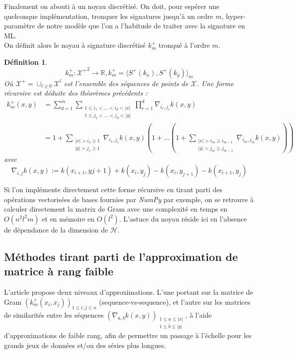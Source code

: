 \documentclass[10pt,a4paper]{article}
\newtheorem{definition}{Définition}
\begin{document}
Finalement on abouti à un noyau discrétisé. On doit, pour espérer une quelconque implémentation, tronquer les signatures jusqu'à un ordre $m$, hyper-paramètre de notre modèle que l'on a l'habitude de traiter avec la signature en ML.\\
On définit alors le noyau à signature discrétisé $k^+_m$ tronqué à l'ordre $m$.
\begin{definition}

\[ k^+_m : {\mathcal{X}^+}^2 \rightarrow \mathbb{R}, k^+_m = \langle S^+ (k_x ), S^+ (k_y ) \rangle_m
\]
Où $\mathcal{X^+} = \cup_{l\geq 0} \mathcal{X}^l $ est l'ensemble des séquences de points de $\mathcal{X}$.
Une forme récursive est déduite des théorèmes précédents :
\begin{align*}
k^+_m(x,y) &= \sum_{d=1}^m \sum_{\substack{1\leq i_1 < \ldots < i_d < |x| \\ 1\leq j_1 < \ldots < j_d < |y| }} \prod_{r=1}^d \nabla_{i_r , j_r}k(x, y)\\
&=1 + \sum_{\substack{|x| > i_1 \geq 1 \\ |y| > j_1 \geq 1 }} \nabla_{i_1, j_1} k(x,y) \left( 1 + \ldots \left(1 + \sum_{\substack{|x| > i_m \geq i_{m-1} \\ |y| > j_m \geq j_{m-1} }} \nabla_{i_m, j_m} k(x,y) \right) \right)
\end{align*} 
avec \[ \nabla_{i,j} k(x,y) := k(x_{i+1} , y{j+1} ) + k(x_i , y_j ) - k(x_i , y_{j+1} ) - k(x_{i+1} , y_j ) \]


\end{definition}


Si l'on implémente directement cette forme récursive en tirant parti des opérations vectorisées de bases fournies par \textit{NumPy} par exemple, on se retrouve à calculer directement la matrix de Gram avec une complexité en temps en $O(n^2  l^2 m)$ et en mémoire en $O(l^2)$. L'astuce du noyau réside ici en l'absence de dépendance de la dimension de $\mathcal{H}$. \\

\subsection{Méthodes tirant parti de l'approximation de matrice à rang faible}



L'article propose deux niveaux d'approximations. L'une portant sur la matrice de Gram $(k_m^+ (x_i , x_j))_{1\leq i, j \leq n}$ (sequence-vs-sequence), et l'autre sur les matrices de similarités entre les séquences $\left( \nabla_{a, b} k(x,y) \right)_{\substack{1\leq a \leq |x| \\1\leq b \leq |y| }}$, à l'aide d'approximations de faible rang, afin de permettre un passage à l'échelle pour les grands jeux de données et/ou des séries plus longues.
\end{document}
